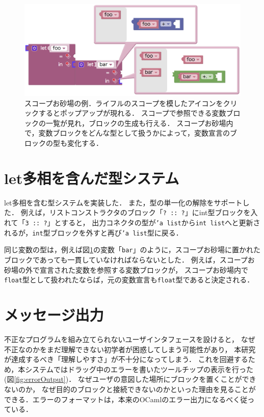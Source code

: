\begin{figure}[h]
 \centering
 \includegraphics[keepaspectratio, scale=0.3]{img/osunaba3.png}
 \caption{スコープお砂場の例．ライフルのスコープを模したアイコンをクリックするとポップアップが現れる．
スコープで参照できる変数ブロックの一覧が見れ，ブロックの生成も行える．
スコープお砂場内で，変数ブロックをどんな型として扱うかによって，変数宣言のブロックの型も変化する．\label{fig:osunaba}}
\end{figure}

\section {let多相を含んだ型システム}

let多相を含む型システムを実装した．
また，型の単一化の解除をサポートした．
例えば，リストコンストラクタのブロック「{\tt ?\ ::\ ?}」にint型ブロックを入れて「{\tt 3 ::\ ?}」とすると，
出力コネクタの型が{\tt 'a list}から{\tt int list}へと更新されるが，{\tt int}型ブロックを外すと再び{\tt 'a list}型に戻る．

同じ変数の型は，例えば図\ref{fig:osunaba}の変数「{\tt bar}」のように，スコープお砂場に置かれたブロックであっても一貫していなければならないとした．
例えば，スコープお砂場の外で宣言された変数を参照する変数ブロックが，
スコープお砂場内で{\tt float}型として扱われたならば，元の変数宣言も{\tt float}型であると決定される．

\section {メッセージ出力\label{fun:message}}

不正なプログラムを組み立てられないユーザインタフェースを設けると，
なぜ不正なのかをまだ理解できない初学者が困惑してしまう可能性があり，
本研究が達成するべき「理解しやすさ」が不十分になってしまう．
これを回避するため，本システムではドラッグ中のエラーを書いたツールチップの表示を行った(図\ref{fig:errorOutput})．
なぜユーザの意図した場所にブロックを置くことができないのか，
なぜ目的のブロックと接続できないのかといった理由を見ることができる．エラーのフォーマットは，本来のOCamlのエラー出力になるべく従っている．

